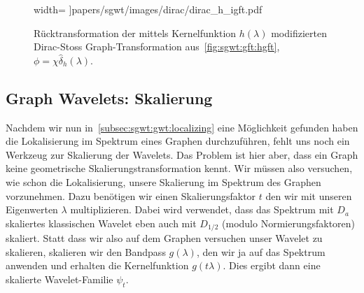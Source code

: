 \begin{figure}
\begin{minipage}[t]{0.49\textwidth}
        width=\textwidth
        ]{papers/sgwt/images/dirac/dirac_h_igft.pdf}
        \vspace{-0pt}
        \caption{R\"ucktransformation der mittels Kernelfunktion $h(\lambda)$ 
        modifizierten Dirac-Stoss Graph-Transformation
        aus~\cref{fig:sgwt:gft:hgft}, $\phi = \chi\hat{\delta}_h(\lambda)$.
        \label{fig:sgwt:gft:ihgft}}
    \end{minipage}
\end{figure}

\subsection{Graph Wavelets: Skalierung\label{subsec:sgwt:gwt:scaling}}

Nachdem wir nun in~\cref{subsec:sgwt:gwt:localizing} eine M\"oglichkeit 
gefunden haben die Lokalisierung im Spektrum eines Graphen durchzuf\"uhren, 
fehlt uns noch ein Werkzeug zur Skalierung der Wavelets. Das Problem ist hier 
aber, dass ein Graph keine geometrische Skalierungstransformation kennt. Wir 
m\"ussen also versuchen, wie schon die Lokalisierung, unsere 
Skalierung im Spektrum des Graphen vorzunehmen. Dazu ben\"otigen wir einen 
Skalierungsfaktor $t$ den wir mit unseren Eigenwerten $\lambda$ multiplizieren.
Dabei wird verwendet, dass das Spektrum mit $D_a$ skaliertes klassischen 
Wavelet eben auch mit $D_{1/2}$ (modulo Normierungsfaktoren) skaliert. Statt 
dass wir also auf dem Graphen versuchen unser Wavelet zu skalieren, skalieren 
wir den Bandpass $g(\lambda)$, den wir ja auf das Spektrum anwenden und 
erhalten die Kernelfunktion $g(t\lambda)$. Dies ergibt dann eine skalierte 
Wavelet-Familie $\psi_t$.

